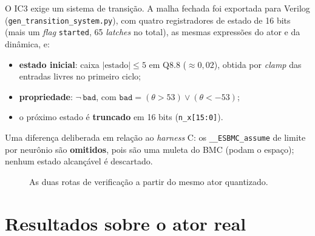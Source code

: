 \documentclass[12pt,openright,oneside,a4paper,chapter=TITLE,sumario=tradicional,english,brazil]{abntex2}
\begin{document}
O IC3 exige um sistema de transição. A malha fechada foi exportada para Verilog (\texttt{gen\_transition\_system.py}), com quatro registradores de estado de 16 bits (mais um \emph{flag} \texttt{started}, 65 \emph{latches} no total), as mesmas expressões do ator e da dinâmica, e:
\begin{itemize}
  \item \textbf{estado inicial}: caixa $|\text{estado}|\le5$ em Q8.8 ($\approx0{,}02$), obtida por \emph{clamp} das entradas livres no primeiro ciclo;
  \item \textbf{propriedade}: $\lnot\,\texttt{bad}$, com $\texttt{bad}=(\theta>53)\lor(\theta<-53)$;
  \item o próximo estado é \textbf{truncado} em 16 bits (\texttt{n\_x[15:0]}).
\end{itemize}
Uma diferença deliberada em relação ao \emph{harness} C: os \texttt{\_\_ESBMC\_assume} de limite por neurônio são \textbf{omitidos}, pois são uma muleta do BMC (podam o espaço); nenhum estado alcançável é descartado.

\begin{figure}[htb]
  \caption{As duas rotas de verificação a partir do mesmo ator quantizado.}\label{fig:rotas}
  \centering
\end{figure}

\section{Resultados sobre o ator real}
\end{document}

